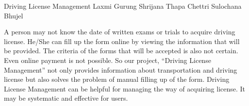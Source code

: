  \begin{conf-abstract}[]
 {Driving License Management }
 {Laxmi Gurung
 	Shrijana Thapa Chettri
 	Sulochana Bhujel
 }
{}

A person may not know the date of written exams or trials to acquire driving license. He/She can fill up the form online by viewing the information that will be provided. The criteria of the forms that will be accepted is also not certain. Even online payment is not possible. So our project, “Driving License Management” not only provides information about transportation and driving license but also solves the problem of manual filling up of the form. Driving License Management can be helpful for managing the way of acquiring license. It may be systematic and effective for users.
 \end{conf-abstract}